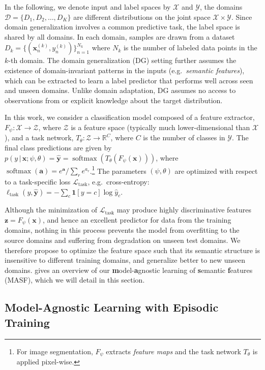 \documentclass{article}
\newcommand{\Reals}{\mathds{R}}
\newcommand{\Domains}{\mathcal{D}}
\newcommand{\TaskLoss}{\mathcal{L}_\mathrm{task}}
\newcommand{\given}{\,|\,}
\newcommand{\softmax}{\operatorname{softmax}}
\newcommand{\indicator}[1]{\mathbf{1}[#1]}
\def\*#1{\mathbf{#1}}
\begin{document}
In the following, we denote input and label spaces by $\mathcal{X}$ and $\mathcal{Y}$, the domains $\Domains=\{D_1,D_2,\dots,D_K\}$ are different distributions on the joint space $\mathcal{X} \times \mathcal{Y}$. Since domain generalization involves a common predictive task, the label space is shared by all domains.
In each domain, samples are drawn from a dataset $D_k=\{(\*x_n^{(k)},y_n^{(k)})\}_{n=1}^{N_k}$ where $N_k$ is the number of labeled data points in the $k$-th domain.
The domain generalization (DG) setting further assumes the existence of domain-invariant patterns in the inputs (e.g.\ \emph{semantic features}), which can be extracted to learn a label predictor that performs well across seen and unseen domains. Unlike domain adaptation, DG assumes no access to observations from or explicit knowledge about the target distribution.

In this work, we consider a classification model composed of a feature extractor, $F_\psi:\mathcal{X}\to\mathcal{Z}$, where $\mathcal{Z}$ is a feature space (typically much lower-dimensional than $\mathcal{X}$), and a task network, $T_\theta:\mathcal{Z}\to\Reals^C$, where $C$ is the number of classes in $\mathcal{Y}$. The final class predictions are given by $p(y \given \*x; \psi,\theta)=\hat{\*y} = \softmax(T_\theta(F_\psi(\*x)))$, where  $\softmax(\*a)=e^\*a/\sum_r e^{a_r}$.\footnote{For image segmentation, $F_\psi$ extracts \emph{feature maps} and the task network $T_\theta$ is applied pixel-wise.}
The parameters $(\psi,\theta)$ are optimized with respect to a task-specific loss $\TaskLoss$, e.g.\ cross-entropy: $\ell_\mathrm{task}(y,\hat{\*y})=-\sum_c \indicator{y=c}\log\hat{y}_c$.

Although the minimization of $\TaskLoss$ may produce highly discriminative features $\*z=F_\psi(\*x)$, and hence an excellent predictor for data from the training domains, nothing in this process prevents the model from overfitting to the source domains and suffering from degradation on unseen test domains. We therefore propose to optimize the feature space such that its semantic structure is insensitive to different training domains, and generalize better to new unseen domains. 
 gives an overview of our
\textbf{m}odel-\textbf{a}gnostic learning of \textbf{s}emantic \textbf{f}eatures (MASF),
which we will detail in this section.


\subsection{Model-Agnostic Learning with Episodic Training}
\end{document}
